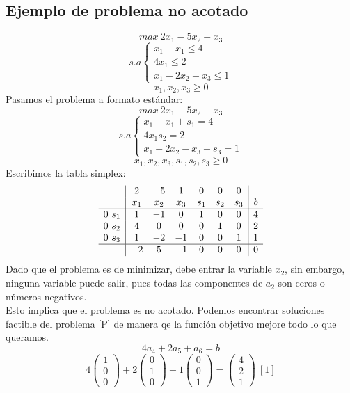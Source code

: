 \documentclass[11pt,fleqn]{book} %
\begin{document}
\subsection{Ejemplo de problema no acotado}
$$ max ~2x_1 - 5x_2 + x_3$$
$$
s.a \left\{ 
\begin{array}{c}
x_1-x_1 \leq 4 \\
4x_1 \leq 2 \\
x_1 - 2x_2 - x_3 \leq 1
\end{array}
\right.$$
$$x_1, x_2, x_3 \geq 0$$ \newpage
Pasamos el problema a formato estándar:
$$ max ~2x_1 - 5x_2 + x_3$$
$$
s.a \left\{ 
\begin{array}{c}
x_1-x_1+s_1 = 4 \\
4x_1 s_2 = 2 \\
x_1 - 2x_2 - x_3 + s_3 = 1
\end{array}
\right.$$
$$x_1, x_2, x_3, s_1, s_2, s_3 \geq 0$$
Escribimos la tabla simplex:
$$
\begin{array}{c|cccccc|c}
& 2 & -5 & 1 & 0 & 0 & 0 & \\
& x_1 & x_2 & x_3 & s_1 & s_2 & s_3 & b \\ \hline
0 ~s_1 & 1 & -1 & 0 & 1 & 0 & 0 & 4 \\
0 ~ s_2 & 4 & 0 & 0 & 0 & 1 & 0 & 2 \\
0 ~s_3 & 1 & -2 & -1 & 0 & 0 & 1 & 1 \\ \hline
& -2 & 5 & -1 & 0 & 0 & 0 & 0
\end{array}
$$
Dado que el problema es de minimizar, debe entrar la variable $x_2$, sin embargo, ninguna variable puede salir, pues todas las componentes de $a_2$ son ceros o números negativos. \\
Esto implica que el problema es no acotado. Podemos encontrar soluciones factible del problema [P] de manera qe la función objetivo mejore todo lo que queramos.
$$ 4 a_4+2a_5+a_6=b$$
$$4 \left(\begin{array}{c}
1 \\ 0 \\ 0
\end{array}\right)+2\left(\begin{array}{c}
0 \\ 1 \\ 0
\end{array}\right)+1\left(\begin{array}{c}
0 \\ 0 \\ 1
\end{array}\right)=\left(\begin{array}{c}
4 \\ 2 \\ 1
\end{array}\right) ~ [1]$$
\end{document}
